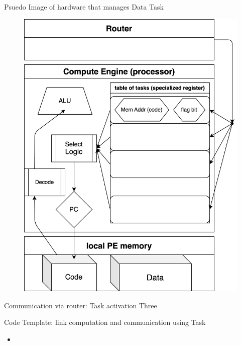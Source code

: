 \documentclass[dvipdfmx, 11pt, aspectratio=169]{beamer}   %
\begin{document}
\begin{frame}{Psuedo Image of hardware that manages Data Task}
\begin{figure}
    \includegraphics[scale=0.08]{img/npcGen.png}
\end{figure}
\end{frame}
\begin{frame}{Communication via router: Task activation}
Three
\end{frame}
\begin{frame}{Code Template: link computation and communication using Task}
\begin{itemize}
\item 
\end{itemize}
\end{frame}
\end{document}
